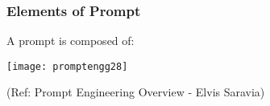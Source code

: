 




\begin{frame}[fragile]\frametitle{Elements of Prompt}

A prompt is composed of:

\begin{center}
\texttt{[image: promptengg28]}

{\tiny (Ref: Prompt Engineering Overview - Elvis Saravia)}

\end{center}		
		
\end{frame}


